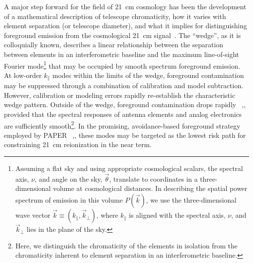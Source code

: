 \documentclass[twocolumn]{emulateapj}
\begin{document}
A major step forward for the field of 21~cm cosmology has been the development
of a mathematical description of telescope chromaticity, how it varies with
element separation (or telescope diameter), and what it implies for distinguishing
foreground emission from the cosmological 21~cm signal~\citep{Thyagarajan_et_al2015}.  The ``wedge'', as it is
colloquially known, describes a linear relationship between the separation between elements
in an interferometric baseline and the maximum line-of-sight Fourier mode\footnote{Assuming
a flat sky and using appropriate
cosmological scalars,
the spectral axis, $\nu$, and angle on the sky, $\vec\theta$, translate to coordinates in
a three-dimensional volume at cosmological distances.  In describing the spatial power spectrum of
emission in this volume $P(\vec k)$, we use the three-dimensional wave vector 
$\vec k\equiv(k_\parallel,\vec k_\perp)$, where $k_\parallel$ is aligned with the
spectral axis, $\nu$, and $\vec k_\perp$ lies in the plane of the sky.}
that may be occupied by smooth spectrum foreground emission.  At low-order $k_\parallel$ modes
within the limits of the wedge,
foreground contamination may be suppressed through a combination of calibration and model 
subtraction.  However, calibration or modeling errors rapidly re-establish the characteristic
wedge pattern.  Outside of the wedge, foreground contamination drops rapidly 
~\citep{pober_et_al2013},\citep{Thyagarajan_et_al2015}, provided that the spectral responses
of antenna elements and analog electronics are sufficiently smooth\footnote{Here, we distinguish
the chromaticity of the elements in isolation from the chromaticity inherent to
element separation in an interferometric baseline.}.  In the promising, avoidance-based
foreground strategy employed by PAPER ~\citep{parsons_et_al2014},\citep{Ali_et_al2015}, these modes
may be targeted as the lowest risk path for constraining 21~cm reionization in the near term.
  
\end{document}
